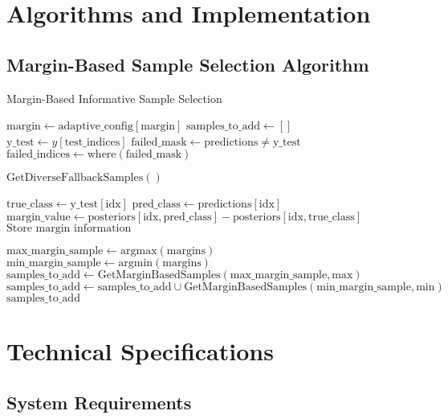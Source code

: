 \documentclass[11pt]{article}
\begin{document}
\section{Algorithms and Implementation}

\subsection{Margin-Based Sample Selection Algorithm}

\begin{algorithm}
\caption{Margin-Based Informative Sample Selection}
\begin{algorithmic}[1]
\State $\text{margin} \gets \text{adaptive\_config}[\text{margin}]$
\State $\text{samples\_to\_add} \gets []$
\State $\text{y\_test} \gets y[\text{test\_indices}]$
\State $\text{failed\_mask} \gets \text{predictions} \neq \text{y\_test}$
\State $\text{failed\_indices} \gets \text{where}(\text{failed\_mask})$

    \State \Return $\text{GetDiverseFallbackSamples}()$
\EndIf

    \State $\text{true\_class} \gets \text{y\_test}[\text{idx}]$
    \State $\text{pred\_class} \gets \text{predictions}[\text{idx}]$
    \State $\text{margin\_value} \gets \text{posteriors}[\text{idx}, \text{pred\_class}] - \text{posteriors}[\text{idx}, \text{true\_class}]$
    \State $\text{Store margin information}$
\EndFor

\State $\text{max\_margin\_sample} \gets \text{argmax}(\text{margins})$
\State $\text{min\_margin\_sample} \gets \text{argmin}(\text{margins})$
\State $\text{samples\_to\_add} \gets \text{GetMarginBasedSamples}(\text{max\_margin\_sample}, \text{max})$
\State $\text{samples\_to\_add} \gets \text{samples\_to\_add} \cup \text{GetMarginBasedSamples}(\text{min\_margin\_sample}, \text{min})$
\State \Return $\text{samples\_to\_add}$
\EndProcedure
\end{algorithmic}
\end{algorithm}

\section{Technical Specifications}

\subsection{System Requirements}
\end{document}
